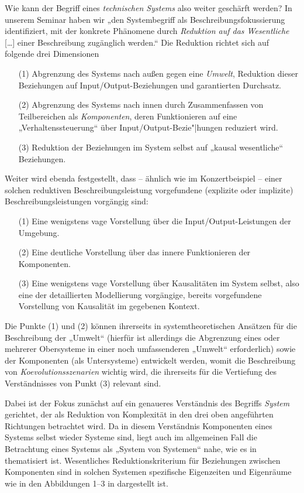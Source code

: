 \documentclass[11pt,a4paper]{article}
\begin{document}
Wie kann der Begriff eines \emph{technischen Systems} also weiter geschärft
werden?  In unserem Seminar \cite{Graebe2020} haben wir „den Systembegriff als
Beschreibungsfokussierung identifiziert, mit der konkrete Phänomene durch
\emph{Reduktion auf das Wesentliche} [\ldots] einer Beschreibung zugänglich
werden.“  Die Reduktion richtet sich auf folgende drei Dimensionen
\cite[S. 18]{Graebe2020} 
\begin{itemize}
\item [(1)] Abgrenzung des Systems nach außen gegen eine \emph{Umwelt},
  Reduktion dieser Beziehungen auf Input/Output-Beziehungen und garantierten
  Durchsatz.
\item [(2)] Abgrenzung des Systems nach innen durch Zusammenfassen von
  Teilbereichen als \emph{Komponenten}, deren Funktionieren auf eine
  „Verhaltenssteuerung“ über Input/Output-Bezie"|hungen reduziert wird.
\item [(3)] Reduktion der Beziehungen im System selbst auf „kausal
  wesentliche“ Beziehungen.
\end{itemize}
Weiter wird ebenda festgestellt, dass -- ähnlich wie im Konzertbeispiel --
einer solchen reduktiven Beschreibungsleistung vorgefundene (explizite oder
implizite) Beschreibungsleistungen vorgängig sind:
\begin{enumerate}
\item[(1)] Eine wenigstens vage Vorstellung über die Input/Output-Leistungen
  der Umgebung.
\item[(2)] Eine deutliche Vorstellung über das innere Funktionieren der
  Komponenten.
\item[(3)] Eine wenigstens vage Vorstellung über Kausalitäten im System
  selbst, also eine der detaillierten Modellierung vorgängige, bereits
  vorgefundene Vorstellung von Kausalität im gegebenen Kontext.
\end{enumerate}
Die Punkte (1) und (2) können ihrerseits in systemtheoretischen Ansätzen für
die Beschreibung der „Umwelt“ (hierfür ist allerdings die Abgrenzung eines
oder mehrerer Obersysteme in einer noch umfassenderen „Umwelt“ erforderlich)
sowie der Komponenten (als Untersysteme) entwickelt werden, womit die
Beschreibung von \emph{Koevolutionsszenarien} wichtig wird, die ihrerseits für
die Vertiefung des Verständnisses von Punkt (3) relevant sind.

Dabei ist der Fokus zunächst auf ein genaueres Verständnis des Begriffs
\emph{System} gerichtet, der als Reduktion von Komplexität in den drei oben
angeführten Richtungen betrachtet wird. Da in diesem Verständnis Komponenten
eines Systems selbst wieder Systeme sind, liegt auch im allgemeinen Fall die
Betrachtung eines Systems als „System von Systemen“ nahe, wie es in
\cite{Holling2000} thematisiert ist.  Wesentliches Reduktionskriterium für
Beziehungen zwischen Komponenten sind in solchen Systemen spezifische
Eigenzeiten und Eigenräume wie in den Abbildungen 1--3 in \cite{Holling2000}
dargestellt ist.
\end{document}
